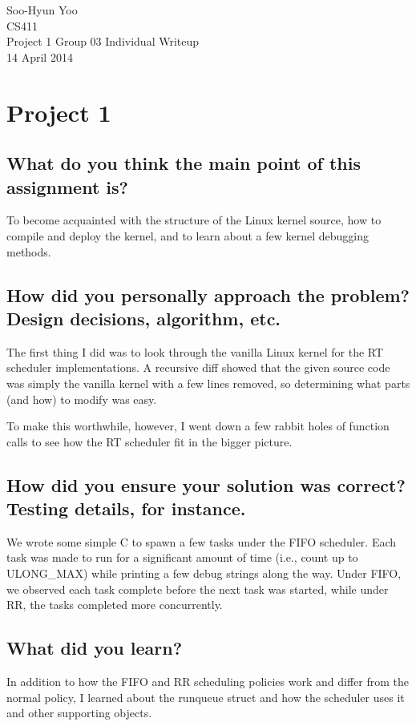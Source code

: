 \documentclass[11pt,letterpaper]{article}
\begin{document}
Soo-Hyun Yoo \\
CS411 \\
Project 1 Group 03 Individual Writeup \\
14 April 2014


\section*{Project 1}

\subsection*{What do you think the main point of this assignment is?}

To become acquainted with the structure of the Linux kernel source, how to
compile and deploy the kernel, and to learn about a few kernel debugging
methods.


\subsection*{How did you personally approach the problem? Design decisions,
algorithm, etc.}

The first thing I did was to look through the vanilla Linux kernel for the RT
scheduler implementations. A recursive diff showed that the given source code
was simply the vanilla kernel with a few lines removed, so determining what
parts (and how) to modify was easy.

To make this worthwhile, however, I went down a few rabbit holes of function
calls to see how the RT scheduler fit in the bigger picture.


\subsection*{How did you ensure your solution was correct? Testing details, for
instance.}

We wrote some simple C to spawn a few tasks under the FIFO scheduler. Each task
was made to run for a significant amount of time (i.e., count up to ULONG\_MAX)
while printing a few debug strings along the way. Under FIFO, we observed each
task complete before the next task was started, while under RR, the tasks
completed more concurrently.


\subsection*{What did you learn?}

In addition to how the FIFO and RR scheduling policies work and differ from the
normal policy, I learned about the runqueue struct and how the scheduler uses
it and other supporting objects.
\end{document}
